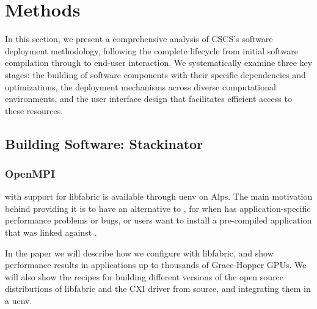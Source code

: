 \section{Methods}
\label{sec:flow}

In this section, we present a comprehensive analysis of CSCS's software deployment methodology, following the complete lifecycle from initial software compilation through to end-user interaction.
We systematically examine three key stages: the building of software components with their specific dependencies and optimizations, the deployment mechanisms across diverse computational environments, and the user interface design that facilitates efficient access to these resources.

\subsection{Building Software: Stackinator}

\subsubsection{OpenMPI}

\openmpi with support for libfabric is available through uenv on Alps.
The main motivation behind providing it is to have an alternative to \craympich, for when \craympich has application-specific performance problems or bugs, or users want to install a pre-compiled application that was linked against \openmpi.

In the paper we will describe how we configure \openmpi with libfabric, and show performance results in applications up to thousands of Grace-Hopper GPUs.
We will also show the recipes for building different versions of the open source distributions of libfabric and the CXI driver from source, and integrating them in a uenv.

